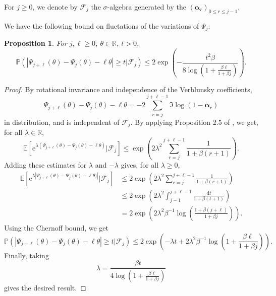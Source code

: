 \documentclass[]{article}
\newtheorem{prop}[thm]{Proposition}
\begin{document}
For $j \geq 0$, we denote by $\mathcal{F}_j$ the $\sigma$-algebra generated by the $(\boldsymbol{\alpha}_r)_{0 \leq r \leq j-1}$. 


We have the following bound on fluctations of the variations of $\Psi_j$: 
\begin{prop} \label{boundlargefluctuationpsi}
For $j, \ell \geq 0$, $\theta \in \mathbb{R}$, $t > 0$, 
$$\mathbb{P} \left(| \Psi_{j+\ell} (\theta) - \Psi_j (\theta) - \ell \theta | \geq t | \mathcal{F}_j \right)
\leq 2 \exp \left( - \frac{t^2 \beta}{8 \log \left(1 + \frac{\beta \ell}{1 + \beta j} \right)}\right).$$
\end{prop}
\begin{proof}
By rotational invariance and independence of the Verblunsky coefficients, 
$$\Psi_{j+\ell}(\theta) - \Psi_j (\theta) - \ell \theta = - 2 \sum_{r = j}^{j+ \ell - 1} 
\Im \log ( 1 - \boldsymbol{\alpha}_r) $$
in distribution, and is independent of 
$\mathcal{F}_j$. 
By applying Proposition 2.5 of \cite{ChhaibiMadauleNajnudel}, we get, for all $\lambda \in \mathbb{R}$, 
$$\mathbb{E} \left[ \mathrm{e}^{\lambda (\Psi_{j+\ell}(\theta) - \Psi_j (\theta) - \ell \theta)} \big| \mathcal{F}_j\right] 
\leq \exp \left( 2 \lambda^2 \sum_{r = j}^{j+\ell - 1} \frac{1}{1 + \beta(r+1)}\right).
$$
Adding these estimates for $\lambda$ and $- \lambda$ gives, for all $\lambda \geq 0$, 
\begin{align*} \mathbb{E} \left[ \mathrm{e}^{\lambda |\Psi_{j+\ell}(\theta) - \Psi_j (\theta) - \ell \theta)|} \big| \mathcal{F}_j\right] & 
\leq 2 \exp \left( 2 \lambda^2 \sum_{r = j}^{j+\ell - 1} \frac{1}{1 + \beta(r+1)}\right)
\\ & \leq 2 \exp \left( 2 \lambda^2 \int_{j-1}^{j+\ell - 1} \frac{\mathrm{d}t}{1 + \beta(t+1)} \right)
\\ & = 2 \exp \left( 2 \lambda^2 \beta^{-1} \log \left( 
\frac{1 + \beta(j+\ell)}{1 + \beta j} \right) \right).
\end{align*}
Using the Chernoff bound, we get 
$$\mathbb{P} \left(| \Psi_{j+\ell} (\theta) - \Psi_j (\theta) - \ell \theta | \geq t | \mathcal{F}_j \right)
\leq 2 \exp \left(- \lambda t +  2 \lambda^2 \beta^{-1}\log \left( 1 + 
\frac{ \beta \ell}{1 + \beta j} \right) \right).$$
Finally, taking 
$$\lambda =\frac{ \beta t}{4  \log \left( 1 + 
\frac{ \beta \ell}{1 + \beta j} \right) } $$
gives the desired result. 

\end{proof}
\end{document}
